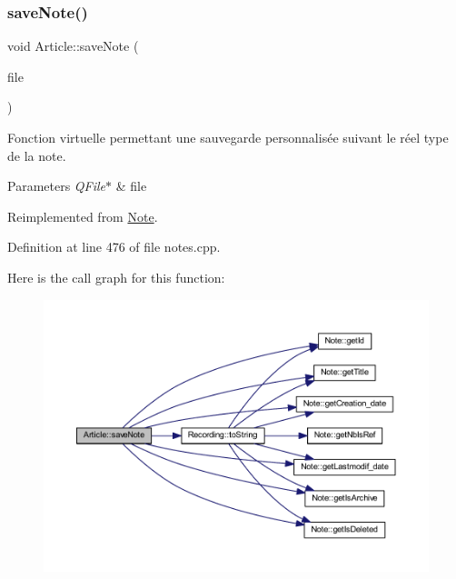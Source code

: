 \subsubsection{\texorpdfstring{save\+Note()}{saveNote()}}
{\footnotesize\ttfamily void Article\+::save\+Note (\begin{DoxyParamCaption}\item[{Q\+File $\ast$}]{file }\end{DoxyParamCaption})\hspace{0.3cm}{\ttfamily [virtual]}}



Fonction virtuelle permettant une sauvegarde personnalisée suivant le réel type de la note. 


\begin{DoxyParams}{Parameters}
{\em Q\+File$\ast$} & file \\
\hline
\end{DoxyParams}


Reimplemented from \hyperlink{class_note_a0c2cc72d7f3235c665a30ef915c5c58d}{Note}.



Definition at line 476 of file notes.\+cpp.

Here is the call graph for this function\+:\nopagebreak
\begin{figure}[H]
\begin{center}
\leavevmode
\includegraphics[width=350pt]{class_article_a83c6688e4886b871938b9dca34e78041_cgraph}
\end{center}
\end{figure}
\mbox{\label{class_article_a7144942027b1761cfcbd21761dd5cee8}} 
